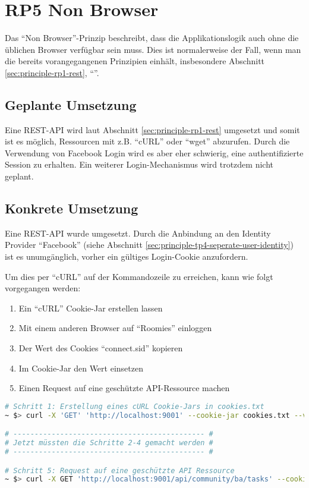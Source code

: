 \section{RP5 Non Browser}
\label{sec:principle-rp5-non-browser}

Das ``Non Browser''-Prinzip beschreibt, dass die Applikationslogik auch ohne die üblichen Browser verfügbar sein muss. Dies ist normalerweise der Fall, wenn man die bereits vorangegangenen Prinzipien einhält, insbesondere Abschnitt \ref{sec:principle-rp1-rest}, ``''.

\subsection*{Geplante Umsetzung}
Eine \gls{REST}-API wird laut Abschnitt \ref{sec:principle-rp1-rest} umgesetzt und somit ist es möglich, Ressourcen mit z.B. ``cURL'' \cite{curl} oder ``wget'' \cite{wget} abzurufen.
Durch die Verwendung von Facebook Login wird es aber eher schwierig, eine authentifizierte Session zu erhalten. Ein weiterer Login-Mechanismus wird trotzdem nicht geplant.

\subsection*{Konkrete Umsetzung}
Eine REST-API wurde umgesetzt. Durch die Anbindung an den Identity Provider ``Facebook'' (siehe Abschnitt \ref{sec:principle-tp4-seperate-user-identity}) ist es unumgänglich, vorher ein gültiges Login-Cookie anzufordern.

Um dies per ``cURL'' auf der Kommandozeile zu erreichen, kann wie folgt vorgegangen werden:
\begin{enumerate}
	\item Ein ``cURL'' Cookie-Jar erstellen lassen
	\item Mit einem anderen Browser auf ``Roomies'' einloggen
	\item Der Wert des Cookies ``connect.sid'' kopieren
	\item Im Cookie-Jar den Wert einsetzen
	\item Einen Request auf eine geschützte API-Ressource machen
\end{enumerate}

\begin{lstlisting}[language=Bash, caption=cURL Request auf Roomies, label=lst:curlRoomiesAPI]
# Schritt 1: Erstellung eines cURL Cookie-Jars in cookies.txt
~ $> curl -X 'GET' 'http://localhost:9001' --cookie-jar cookies.txt --verbose --location

# --------------------------------------------- #
# Jetzt müssten die Schritte 2-4 gemacht werden #
# --------------------------------------------- #

# Schritt 5: Request auf eine geschützte API Ressource
~ $> curl -X GET 'http://localhost:9001/api/community/ba/tasks' --cookie cookies.txt  --verbose --location
\end{lstlisting}


